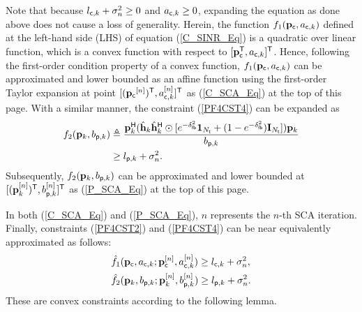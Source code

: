 \documentclass[draftclsnofoot, onecolumn, comsoc, 12pt]{IEEEtran}
\begin{document}
Note that because $l_{{\sf{c}}, k} + \sigma_{n}^2 \geq 0$ and $a_{{\sf{c}}, k} \geq 0$, expanding the equation as done above does not cause a loss of generality.
Herein, the function $f_{1}{(\mathbf{p}_{\sf{c}}, a_{{\sf{c}},k})}$ defined at the {left-hand side (LHS)} of equation (\ref{C_SINR_Eq}) is a quadratic over linear function, which is a convex function with respect to $[\mathbf{p}_{\sf{c}}^{\sf{T}}, a_{{\sf{c}},k}]^{\sf{T}}$. Hence, following the first-order condition property of a convex function, $f_{1}{(\mathbf{p_{\sf{c}}}, a_{{\sf{c}},k})}$ can be approximated and lower bounded as an affine function using the first-order Taylor expansion at point $[(\mathbf{p_{\sf{c}}}^{[n]} )^{\sf{T}}, {a_{{\sf{c}},k}^{[n]}}]^{\sf{T}}$ as {(\ref{C_SCA_Eq}) at the top of this page.} 
With a similar manner, the constraint (\ref{PF4CST4}) can be expanded as
\begin{align}
\label{P_SINR_Eq}
f_{2}{(\mathbf{p}_{k}, b_{{\sf{p}},k})} & \triangleq \frac{\mathbf{p}_{k}^{\sf{H}}(\hat{\mathbf{h}}_{k} \hat{\mathbf{h}}_{k}^{\sf{H}} \odot [e^{-\delta_{\sf{fb}}^{2}}\mathbf{1}_{N_{{\sf{t}}}} + (1-e^{-\delta_{\sf{fb}}^{2}})\mathbf{I}_{N_{{\sf{t}}}}])\mathbf{p}_{k}} {b_{{\sf{p}},k}}
\nonumber \\
& \geq l_{{\sf{p}},k} + \sigma_{n}^{2}.
\end{align} 
Subsequently, $f_{2}{(\mathbf{p}_{k}, b_{{\sf{p}},k})}$ can be approximated and lower bounded at $[(\mathbf{p}_{k}^{[n]})^{\sf{T}},{b_{{\sf{p}},k}^{[n]}}]^{\sf{T}}$ as {(\ref{P_SCA_Eq}) at the top of this page.} 

In both (\ref{C_SCA_Eq}) and (\ref{P_SCA_Eq}), $n$ represents the $n$-th SCA iteration. Finally, constraints (\ref{PF4CST2}) and (\ref{PF4CST4}) can be near equivalently approximated as follows:
 \begin{align}
 \label{C_SCA_AP}
 &\hat{f}_{1}{(\mathbf{p}_{\sf{c}}, a_{{\sf{c}},k};\mathbf{p}_{\sf{c}}^{[n]}, a_{{\sf{c}},k}^{[n]})} \geq l_{{\sf{c}},k} + \sigma_{n}^{2}, \\
 \label{P_SCA_AP}
 &\hat{f}_{2}{(\mathbf{p}_{k}, b_{{\sf{p}},k} ; \mathbf{p}_{k}^{[n]}, b_{{\sf{p}},k}^{[n]})} \geq l_{{\sf{p}},k} + \sigma_{n}^{2}.
 \end{align}
These are convex constraints according to the following lemma. 
\end{document}
